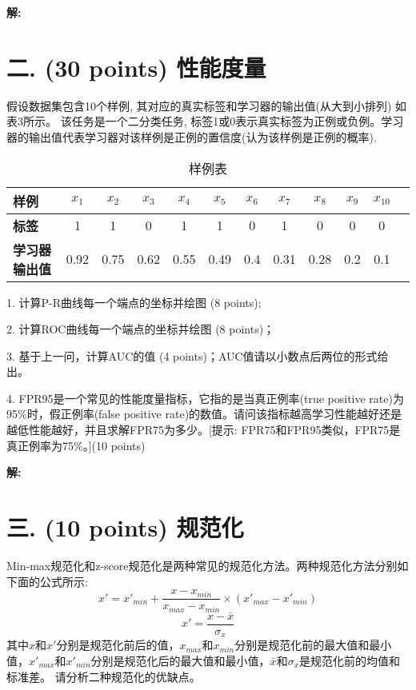 \documentclass[8pt]{article}
\begin{document}
\textbf{\large 解:}

\clearpage


\section*{二. (30 points) 性能度量}
假设数据集包含10个样例, 其对应的真实标签和学习器的输出值(从大到小排列) 如表3所示。
该任务是一个二分类任务, 标签1或0表示真实标签为正例或负例。学习器的输出值代表学习器对该样例是正例的置信度(认为该样例是正例的概率).

\begin{table}[h]
\centering
\begin{tabular}{l|ccccccccccc}
\toprule
\textbf{样例}& $x_1$ & $x_2$ & $x_3$ & $x_4$ & $x_5$ & $x_6$ & $x_7$ & $x_8$ & $x_9$ & $x_{10}$\\
\midrule
\textbf{标签} & 1 & 1 & 0 & 1 & 1 & 0 & 1 & 0 & 0 & 0\\
\midrule
\textbf{学习器输出值} & 0.92    & 0.75 & 0.62 &  0.55 & 0.49 & 0.4 & 0.31 & 0.28 & 0.2 & 0.1\\
\bottomrule
\end{tabular}
\caption{样例表}
\end{table}

1. 计算P-R曲线每一个端点的坐标并绘图 (8 points);

2. 计算ROC曲线每一个端点的坐标并绘图 (8 points)；

3. 基于上一问，计算AUC的值 (4 points)；AUC值请以小数点后两位的形式给出。

4. FPR95是一个常见的性能度量指标，它指的是当真正例率(true positive rate)为95\%时，假正例率(false positive rate)的数值。请问该指标越高学习性能越好还是越低性能越好，并且求解FPR75为多少。[提示: FPR75和FPR95类似，FPR75是真正例率为75\%。](10 points)


\textbf{\large 解:}
\vspace{3em}

\section*{三. (10 points) 规范化}
Min-max规范化和z-score规范化是两种常见的规范化方法。两种规范化方法分别如下面的公式所示:
\begin{equation}
    x' = x'_{min} +  \frac{x-x_{min}}{x_{max}-x_{min}} \times (x'_{max}-x'_{min})
\end{equation}
\begin{equation}
    x' = \frac{x-\bar{x}}{\sigma_x}
\end{equation}
其中$x$和$x'$分别是规范化前后的值，$x_{max}$和$x_{min}$分别是规范化前的最大值和最小值，$x'_{max}$和$x'_{min}$分别是规范化后的最大值和最小值，$\bar{x}$和$\sigma_x$是规范化前的均值和标准差。
请分析二种规范化的优缺点。
\end{document}
